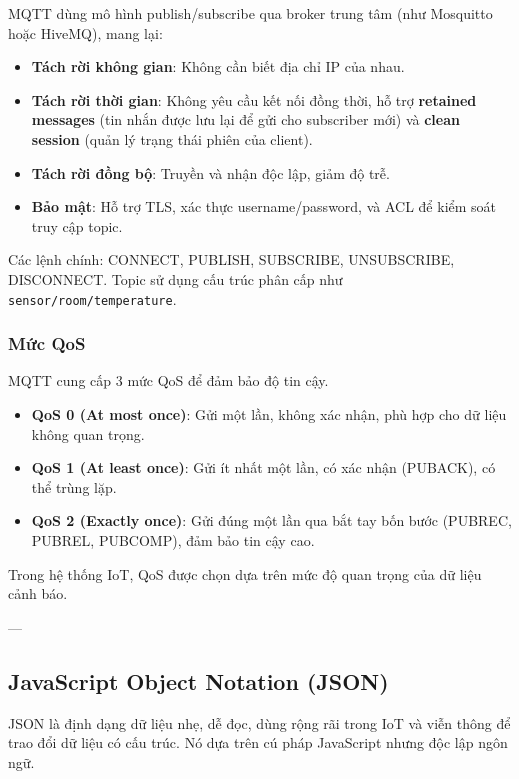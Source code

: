MQTT dùng mô hình publish/subscribe qua broker trung tâm (như Mosquitto hoặc HiveMQ), mang lại:
\begin{itemize}
\item \textbf{Tách rời không gian}: Không cần biết địa chỉ IP của nhau.
\item \textbf{Tách rời thời gian}: Không yêu cầu kết nối đồng thời, hỗ trợ \textbf{retained messages} (tin nhắn được lưu lại để gửi cho subscriber mới) và \textbf{clean session} (quản lý trạng thái phiên của client).
\item \textbf{Tách rời đồng bộ}: Truyền và nhận độc lập, giảm độ trễ.
\item \textbf{Bảo mật}: Hỗ trợ TLS, xác thực username/password, và ACL để kiểm soát truy cập topic.
\end{itemize}

Các lệnh chính: CONNECT, PUBLISH, SUBSCRIBE, UNSUBSCRIBE, DISCONNECT. Topic sử dụng cấu trúc phân cấp như \texttt{sensor/room/temperature}.

\subsubsection{Mức QoS}
\label{subsubsec:mqtt_qos}

MQTT cung cấp 3 mức QoS để đảm bảo độ tin cậy.

\begin{itemize}
\item \textbf{QoS 0 (At most once)}: Gửi một lần, không xác nhận, phù hợp cho dữ liệu không quan trọng.
\item \textbf{QoS 1 (At least once)}: Gửi ít nhất một lần, có xác nhận (PUBACK), có thể trùng lặp.
\item \textbf{QoS 2 (Exactly once)}: Gửi đúng một lần qua bắt tay bốn bước (PUBREC, PUBREL, PUBCOMP), đảm bảo tin cậy cao.
\end{itemize}

Trong hệ thống IoT, QoS được chọn dựa trên mức độ quan trọng của dữ liệu cảnh báo.

---

\subsection{JavaScript Object Notation (JSON)}
\label{subsec:json_format}

JSON là định dạng dữ liệu nhẹ, dễ đọc, dùng rộng rãi trong IoT và viễn thông để trao đổi dữ liệu có cấu trúc. Nó dựa trên cú pháp JavaScript nhưng độc lập ngôn ngữ.

